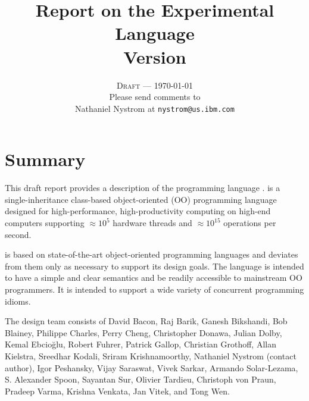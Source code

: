 
\thispagestyle{empty}


\title{Report on the Experimental Language \Xten \\
\large Version \integerversion}
\author{\textsc{Draft} --- \today \\
Please send comments to \\
Nathaniel Nystrom at \texttt{nystrom@us.ibm.com}}
\date{}

\maketitle

\newcommand\authorsc[1]{#1}


\chapter*{Summary}
This draft report provides a description of the programming
language \Xten. \Xten{} is a single-inheritance class-based object-oriented
(OO) programming language designed for high-performance, high-productivity
computing on high-end computers supporting $\approx 10^5$ hardware threads
and $\approx 10^{15}$ operations per second. 

{}\Xten{} is based on state-of-the-art object-oriented programming
languages and deviates from them only as necessary to support its
design goals. The language is intended to have a simple and clear
semantics and be readily accessible to mainstream OO programmers. It
is intended to support a wide variety of concurrent programming
idioms.


The \Xten{} design team consists of
\authorsc{David Bacon}, 
\authorsc{Raj Barik}, 
\authorsc{Ganesh Bikshandi}, 
\authorsc{Bob Blainey}, 
\authorsc{Philippe Charles}, 
\authorsc{Perry Cheng}, 
\authorsc{Christopher Donawa}, 
\authorsc{Julian Dolby}, 
\authorsc{Kemal Ebcio\u{g}lu},
\authorsc{Robert Fuhrer},
\authorsc{Patrick Gallop}, 
\authorsc{Christian Grothoff}, 
\authorsc{Allan Kielstra}, 
\authorsc{Sreedhar Kodali}, 
\authorsc{Sriram Krishnamoorthy}, 
\authorsc{Nathaniel Nystrom} (contact author),  
\authorsc{Igor Peshansky}, 
\authorsc{Vijay Saraswat},
\authorsc{Vivek Sarkar},
\authorsc{Armando Solar-Lezama},  
\authorsc{S. Alexander Spoon}, 
\authorsc{Sayantan Sur}, 
\authorsc{Olivier Tardieu},
\authorsc{Christoph von Praun},
\authorsc{Pradeep Varma},
\authorsc{Krishna Venkata},
\authorsc{Jan Vitek}, and
\authorsc{Tong Wen}.

